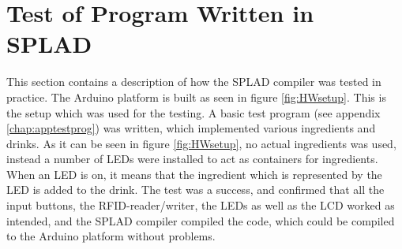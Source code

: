 \section{Test of Program Written in SPLAD}
This section contains a description of how the SPLAD compiler was tested in practice. The Arduino platform is built as seen in figure \ref{fig:HWsetup}. This is the setup which was used for the testing. A basic test program (see appendix \ref{chap:apptestprog}) was written, which implemented various ingredients and drinks. As it can be seen in figure \ref{fig:HWsetup}, no actual ingredients was used, instead a number of LEDs were installed to act as containers for ingredients. When an LED is on, it means that the ingredient which is represented by the LED is added to the drink. The test was a success, and confirmed that all the input buttons, the RFID-reader/writer, the LEDs as well as the LCD worked as intended, and the SPLAD compiler compiled the code, which could be compiled to the Arduino platform without problems.